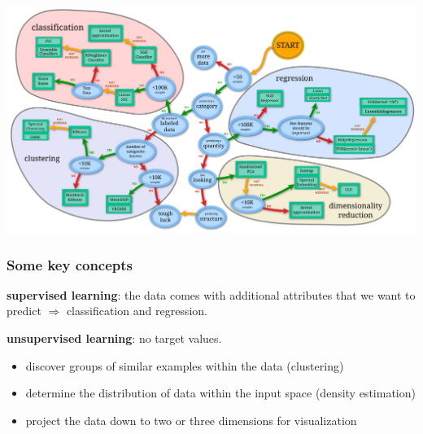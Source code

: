 \begin{frame}
\frametitle{}
\includegraphics[width=\textwidth]{sklearn_material/overview.png}
% 
\end{frame}


\begin{frame}
\frametitle{Some key concepts}



\textbf{supervised learning}: the data comes with additional
attributes that we want to predict $\Longrightarrow$
classification and regression.\\
\vspace{1cm}

\textbf{unsupervised learning}: no target values. 
\begin{itemize}
\item
discover groups of similar examples within the data (clustering)
\item
determine the distribution of data within the input space (density estimation)
\item
project the data down to two or three dimensions for visualization
\end{itemize}

\end{frame}



